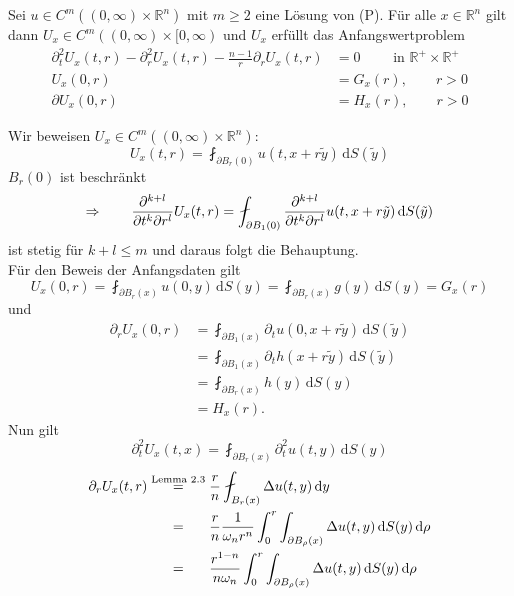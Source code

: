 \begin{lemma}
	Sei $u \in C^m((0,\infty) \times \mathbb{R}^n)$ mit $m \geq 2$ eine Lösung von (P). Für alle $ x \in \mathbb{R}^n$ gilt dann $U_x \in C^m((0,\infty) \times [0,\infty)$ und $U_x$ erfüllt das Anfangswertproblem 
	\begin{align*}
		\partial_t^2 U_x(t,r)- \partial_r^2 U_x(t,r) - \frac{n-1}{r} \partial_r U_x(t,r) &= 0 \qquad \text{ in } \mathbb{R}^{+} \times \mathbb{R}^{+} \\
		U_x(0,r)&= G_x(r), \qquad r>0 \\
		\partial U_x(0,r) &= H_x(r), \qquad r>0
	\end{align*}
\end{lemma}
\begin{beweis}
Wir beweisen $U_x \in C^m((0,\infty) \times \mathbb{R}^n)$:
\[
	U_x(t,r) = \fint_{\partial B_r(0)}^{} u (t,x+r \tilde y) \,\mathrm{d}S(\tilde y)
\]	
$B_r(0)$ ist beschränkt
\[
	\Rightarrow \qquad \diff{^{k+l}}{t^k \partial r^l} U_x(t,r) = \fint_{\partial B_1(0)}^{} \diff{^{k+l}}{t^k \partial r^l} u(t,x+r \tilde y) \,\mathrm{d}S(\tilde y)
\]
ist stetig für $k+l \leq m$ und daraus folgt die Behauptung. \\
Für den Beweis der Anfangsdaten gilt
\[
	U_x(0,r) = \fint_{\partial B_r(x)}^{} u(0,y) \,\mathrm{d}S(y) = \fint_{\partial B_r(x)}^{} g(y) \,\mathrm{d}S(y) = G_x(r)
\]
und
\begin{align*}
	\partial_r U_x(0,r)& = \fint_{\partial B_1(x)}^{} \partial_t u(0,x+ r \tilde y) \,\mathrm{d}S(\tilde y) \\ &= 
	\fint_{\partial B_1(x)}^{} \partial_t h(x+ r \tilde y) \,\mathrm{d}S(\tilde y) \\ &= \fint_{\partial B_r(x)}^{} h(y) \,\mathrm{d}S(y) \\ &= H_x(r).
\end{align*}
Nun gilt
\[
	\partial_t^2U_x(t,x) = \fint_{\partial B_r(x)}^{} \partial_t^2 u(t,y) \,\mathrm{d}S(y)
\]
\begin{align*}
	\partial_r U_x(t,r) &\stackrel{\text{Lemma }2.3}{=} \frac{r}{n} \fint_{B_r(x)}^{} \Delta u(t,y) \,\mathrm{d}y \\
	& \stackrel{\hphantom{\text{Lemma }2.3}}{=} \frac{r}{n} \frac{1}{\omega_n r^n} \int_{0}^{r} \int_{\partial B_{\rho}(x)}^{} \Delta u(t,y) \,\mathrm{d}S(y) \,\mathrm{d}\rho \\
	& \stackrel{\hphantom{\text{Lemma }2.3}}{=} \frac{r^{1-n}}{n \omega_n} \int_{0}^{r} \int_{\partial B_{\rho}(x)}^{} \Delta u(t,y) \,\mathrm{d}S(y) \,\mathrm{d}\rho
\end{align*}


\end{beweis}
